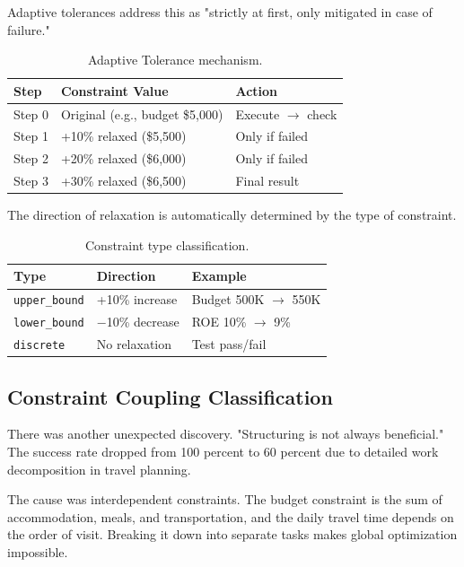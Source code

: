 \documentclass[11pt,a4paper]{article}
\begin{document}
Adaptive tolerances address this as "strictly at first, only mitigated in case of failure."

\begin{table}[h]
\centering
\caption{Adaptive Tolerance mechanism.}
\label{tab:tolerance}
\begin{tabular}{lll}
\toprule
\textbf{Step} & \textbf{Constraint Value} & \textbf{Action} \\
\midrule
Step 0 & Original (e.g., budget \$5,000) & Execute $\rightarrow$ check \\
Step 1 & +10\% relaxed (\$5,500) & Only if failed \\
Step 2 & +20\% relaxed (\$6,000) & Only if failed \\
Step 3 & +30\% relaxed (\$6,500) & Final result \\
\bottomrule
\end{tabular}
\end{table}

The direction of relaxation is automatically determined by the type of constraint.

\begin{table}[h]
\centering
\caption{Constraint type classification.}
\label{tab:constraint-types}
\begin{tabular}{lll}
\toprule
\textbf{Type} & \textbf{Direction} & \textbf{Example} \\
\midrule
\texttt{upper\_bound} & +10\% increase & Budget 500K $\rightarrow$ 550K \\
\texttt{lower\_bound} & $-$10\% decrease & ROE 10\% $\rightarrow$ 9\% \\
\texttt{discrete} & No relaxation & Test pass/fail \\
\bottomrule
\end{tabular}
\end{table}

\subsection{Constraint Coupling Classification}

There was another unexpected discovery. "Structuring is not always beneficial." The success rate dropped from 100 percent to 60 percent due to detailed work decomposition in travel planning.

The cause was interdependent constraints. The budget constraint is the sum of accommodation, meals, and transportation, and the daily travel time depends on the order of visit. Breaking it down into separate tasks makes global optimization impossible.
\end{document}
